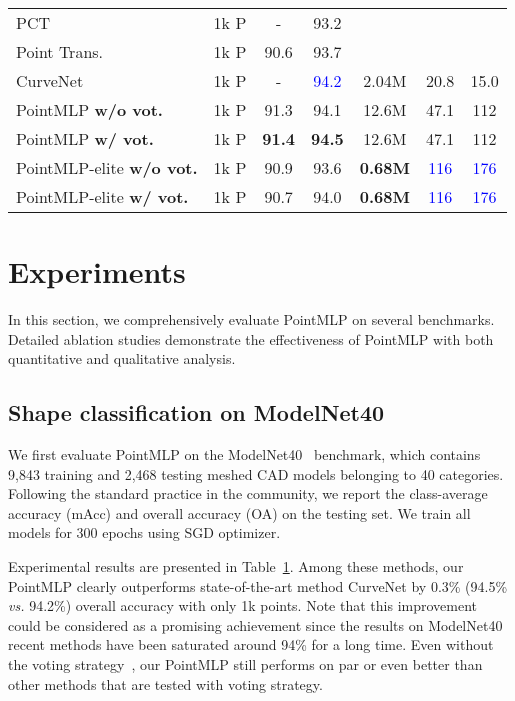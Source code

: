 \documentclass{article} \usepackage{iclr2022_conference,times}
\begin{document}
\begin{table}[]
\begin{tabular}{l|ccc|ccc}
         PCT~\citep{guo2021pct}        &1k P &-&93.2  & & & \\
         Point Trans.~\citep{zhao2021point}  &1k P &90.6&93.7  & & & \\
        CurveNet~\citep{xiang2021walk} &1k P &-&\textcolor{blue}{94.2}  &2.04M & 20.8&15.0 \\
         \midrule
        
        
        
        
        
        
        PointMLP {\small \textbf{w/o vot.}}&1k P &91.3 &94.1  &12.6M &47.1 &112 \\ PointMLP {\small \textbf{w/ vot.}} &1k P &\textbf{91.4} &\textbf{94.5}  &12.6M &47.1 &112\\ 
        PointMLP-elite {\small \textbf{w/o vot.}} &1k P &90.9 &93.6  &\textbf{0.68M} &\textcolor{blue}{116} &\textcolor{blue}{176} \\
        PointMLP-elite {\small \textbf{w/ vot.}} &1k P &90.7 & 94.0 &\textbf{0.68M} &\textcolor{blue}{116} &\textcolor{blue}{176} \\ 
        
         \bottomrule
    \end{tabular}
    \label{tab:classification-modelnet40}
\end{table}

\section{Experiments}
\label{sec:experiments}
In this section, we comprehensively evaluate PointMLP on several benchmarks. Detailed ablation studies demonstrate the effectiveness of PointMLP with both quantitative and qualitative analysis.


\subsection{Shape classification on ModelNet40}
We first evaluate PointMLP on the ModelNet40~\citep{modelnet40} benchmark, which contains 9,843 training and 2,468 testing meshed CAD models belonging to 40 categories. Following the standard practice in the community, we report the class-average accuracy (mAcc) and overall accuracy (OA) on the testing set. We train all models  for 300 epochs using SGD optimizer.

Experimental results are presented in Table~\ref{tab:classification-modelnet40}. Among these methods, our PointMLP clearly outperforms state-of-the-art  method CurveNet  by 0.3\% (94.5\% \textit{vs.} 94.2\%) overall accuracy with only 1k points. Note that this improvement could be considered as a promising achievement since the results on ModelNet40 recent methods have been saturated around 94\% for a long time.
Even without the voting strategy~\citep{liu2019relation}, our PointMLP still performs on par or even better than other methods that are tested with voting strategy.
\end{document}
